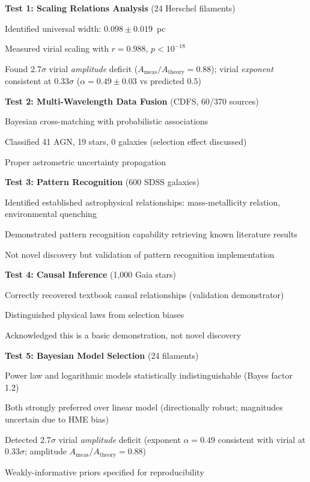\documentclass[usenatbib]{rasti}
\begin{document}
\textbf{Test 1: Scaling Relations Analysis} (24 Herschel filaments)
\begin{description}
\item Identified universal width: $0.098 \pm 0.019$~pc
\item Measured virial scaling with $r = 0.988$, $p < 10^{-18}$
\item Found 2.7$\sigma$ virial \emph{amplitude} deficit ($A_{\mathrm{meas}}/A_{\mathrm{theory}} = 0.88$); virial \emph{exponent} consistent at $0.33\sigma$ ($\alpha = 0.49 \pm 0.03$ vs predicted $0.5$)
\end{description}

\textbf{Test 2: Multi-Wavelength Data Fusion} (CDFS, 60/370 sources)
\begin{description}
\item Bayesian cross-matching with probabilistic associations
\item Classified 41 AGN, 19 stars, 0 galaxies (selection effect discussed)
\item Proper astrometric uncertainty propagation
\end{description}

\textbf{Test 3: Pattern Recognition} (600 SDSS galaxies)
\begin{description}
\item Identified established astrophysical relationships: mass-metallicity relation, environmental quenching
\item Demonstrated pattern recognition capability retrieving known literature results
\item Not novel discovery but validation of pattern recognition implementation
\end{description}

\textbf{Test 4: Causal Inference} (1,000 Gaia stars)
\begin{description}
\item Correctly recovered textbook causal relationships (validation demonstrator)
\item Distinguished physical laws from selection biases
\item Acknowledged this is a basic demonstration, not novel discovery
\end{description}

\textbf{Test 5: Bayesian Model Selection} (24 filaments)
\begin{description}
\item Power law and logarithmic models statistically indistinguishable (Bayes factor 1.2)
\item Both strongly preferred over linear model (directionally robust; magnitudes uncertain due to HME bias)
\item Detected 2.7$\sigma$ virial \emph{amplitude} deficit (exponent $\alpha = 0.49$ consistent with virial at $0.33\sigma$; amplitude $A_{\mathrm{meas}}/A_{\mathrm{theory}} = 0.88$)
\item Weakly-informative priors specified for reproducibility
\end{description}
\end{document}
